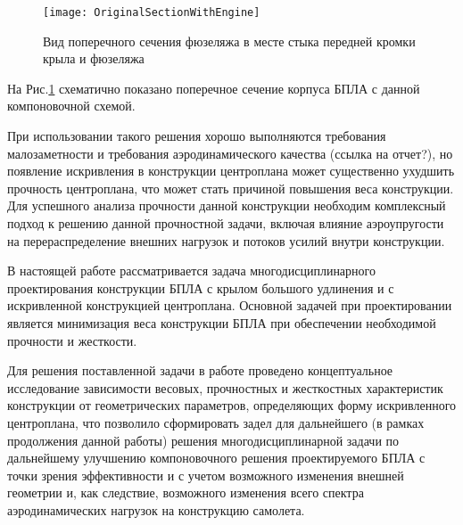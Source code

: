 \begin{figure}[ht]
\captionsetup{justification=centering}
\centering
\texttt{[image: OriginalSectionWithEngine]}
%
\caption{Вид поперечного сечения фюзеляжа в месте стыка передней кромки крыла и фюзеляжа}
\label{fig:OriginalSectionWithEngine}
\end{figure}



На Рис.\ref{fig:OriginalSectionWithEngine} схематично показано поперечное сечение корпуса БПЛА с данной компоновочной схемой.

При использовании такого решения хорошо выполняются требования малозаметности и требования аэродинамического качества (ссылка на отчет?), но появление искривления в конструкции центроплана может существенно ухудшить прочность центроплана, что может стать причиной повышения веса конструкции. Для успешного анализа прочности данной конструкции необходим комплексный подход к решению данной прочностной задачи, включая влияние аэроупругости на перераспределение внешних нагрузок и потоков усилий внутри конструкции.


В настоящей работе рассматривается задача многодисциплинарного проектирования конструкции БПЛА с крылом большого удлинения и с искривленной конструкцией центроплана.  Основной задачей при проектировании является минимизация веса конструкции БПЛА при обеспечении необходимой прочности и жесткости.








Для решения поставленной задачи в работе проведено концептуальное исследование зависимости весовых, прочностных и жесткостных характеристик конструкции от геометрических параметров, определяющих форму искривленного центроплана, что позволило сформировать задел для дальнейшего (в рамках продолжения данной работы) решения многодисциплинарной задачи по дальнейшему улучшению компоновочного решения проектируемого БПЛА с точки зрения эффективности и с учетом возможного изменения внешней геометрии и, как следствие, возможного изменения всего спектра аэродинамических нагрузок на конструкцию самолета.


